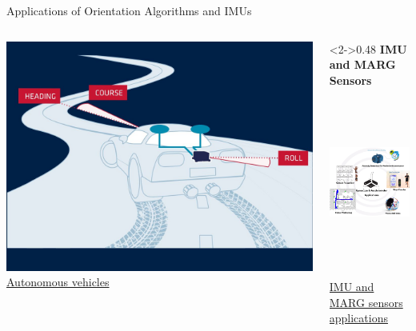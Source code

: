 \documentclass[aspectratio=169,xcolor=dvipsnames]{beamer}
\begin{document}
\begin{frame}{Applications of Orientation Algorithms and IMUs}
\begin{columns}[T, totalwidth=\textwidth]
\begin{column}
    \includegraphics[height=0.2\textheight]{logos/autonomous.jpg}\\[0.2em]
    \href{https://www.sbg-systems.com/vehicles/self-driving-cars/}{Autonomous vehicles}
  \end{column}

  \begin{column}<2->{0.48\textwidth}
    \centering
    \textbf{IMU and MARG Sensors} \\[0.5em]

    \includegraphics[height=6.2cm]{logos/IMU-Applications-EN-768x671.png}\\[0.2em]
    \href{https://atadiat.com/en/e-towards-understanding-imu-basics-of-accelerometer-and-gyroscope-sensors/}{IMU and MARG sensors applications} \\[0.5em]

  \end{column}

\end{columns}
\end{frame}
\end{document}
